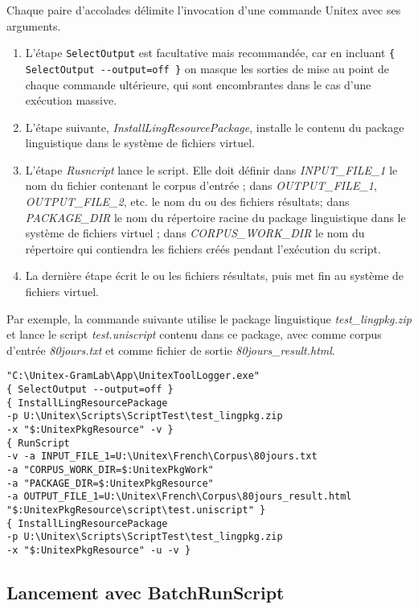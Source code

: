 \noindent Chaque paire d'accolades délimite l'invocation d'une commande Unitex avec ses arguments.

\begin{enumerate}
\item L'étape \verb$SelectOutput$ est facultative mais recommandée, car en incluant \verb${ SelectOutput --output=off }$ on masque les sorties de mise au point de chaque commande ultérieure, qui sont encombrantes dans le cas d'une exécution massive.
\item L'étape suivante, \emph{InstallLingResourcePackage}, installe le contenu du package linguistique dans le système de fichiers virtuel.
\item L'étape \emph{Rusncript} lance le script. Elle doit définir dans \emph{INPUT\_FILE\_1} le nom du fichier contenant le corpus d'entrée ; dans \emph{OUTPUT\_FILE\_1}, \emph{OUTPUT\_FILE\_2}, etc. le nom du ou des fichiers résultats; dans \emph{PACKAGE\_DIR} le nom du répertoire racine du package linguistique dans le système de fichiers virtuel ; dans \emph{CORPUS\_WORK\_DIR} le nom du répertoire qui contiendra les fichiers créés pendant l'exécution du script.
\item La dernière étape écrit le ou les fichiers résultats, puis met fin au système de fichiers virtuel.
\end{enumerate}

\noindent Par exemple, la commande suivante utilise le package linguistique \emph{test\_lingpkg.zip} et lance le script \emph{test.uniscript} contenu dans ce package, avec comme corpus d'entrée \emph{80jours.txt} et comme fichier de sortie \emph{80jours\_result.html}.

\begin{verbatim}
"C:\Unitex-GramLab\App\UnitexToolLogger.exe" 
{ SelectOutput --output=off } 
{ InstallLingResourcePackage 
-p U:\Unitex\Scripts\ScriptTest\test_lingpkg.zip 
-x "$:UnitexPkgResource" -v } 
{ RunScript 
-v -a INPUT_FILE_1=U:\Unitex\French\Corpus\80jours.txt 
-a "CORPUS_WORK_DIR=$:UnitexPkgWork" 
-a "PACKAGE_DIR=$:UnitexPkgResource" 
-a OUTPUT_FILE_1=U:\Unitex\French\Corpus\80jours_result.html 
"$:UnitexPkgResource\script\test.uniscript" } 
{ InstallLingResourcePackage 
-p U:\Unitex\Scripts\ScriptTest\test_lingpkg.zip 
-x "$:UnitexPkgResource" -u -v }
\end{verbatim}

\subsection{Lancement avec BatchRunScript}

